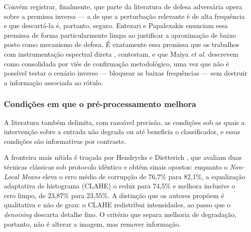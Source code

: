 \documentclass[conference]{IEEEtran}
\begin{document}
Convém registrar, finalmente, que parte da literatura de defesa adversária
opera sobre a premissa inversa --- a de que a perturbação relevante é de alta
frequência e que descartá-la é, portanto, seguro. Entezari e Papalexakis
\cite{b27} enunciam essa premissa de forma particularmente limpa ao justificar
a aproximação de baixo posto como mecanismo de defesa. É exatamente essa
premissa que os trabalhos com instrumentação espectral direta \cite{b18},
\cite{b22} contestam, e que Maiya \textit{et al.} \cite{b22} descrevem como
consolidada por viés de confirmação metodológico, uma vez que não é possível
testar o cenário inverso --- bloquear as baixas frequências --- sem destruir a
informação associada ao rótulo.

\subsubsection{Condições em que o pré-processamento melhora}

A literatura também delimita, com razoável precisão, as condições sob as quais
a intervenção sobre a entrada não degrada ou até beneficia o classificador, e
essas condições são informativas por contraste.

A fronteira mais nítida é traçada por Hendrycks e Dietterich \cite{b6}, que
avaliam duas técnicas clássicas sob protocolo idêntico e obtêm sinais opostos:
enquanto o \textit{Non-Local Means} eleva o erro médio de corrupção de 76,7\%
para 82,1\%, a equalização adaptativa de histograma (CLAHE) o reduz para 74,5\%
e melhora inclusive o erro limpo, de 23,87\% para 23,55\%. A distinção que os
autores propõem é qualitativa e não de grau: o CLAHE redistribui intensidades,
ao passo que o \textit{denoising} descarta detalhe fino. O critério que separa
melhoria de degradação, portanto, não é alterar a imagem, mas remover
informação.
\end{document}
